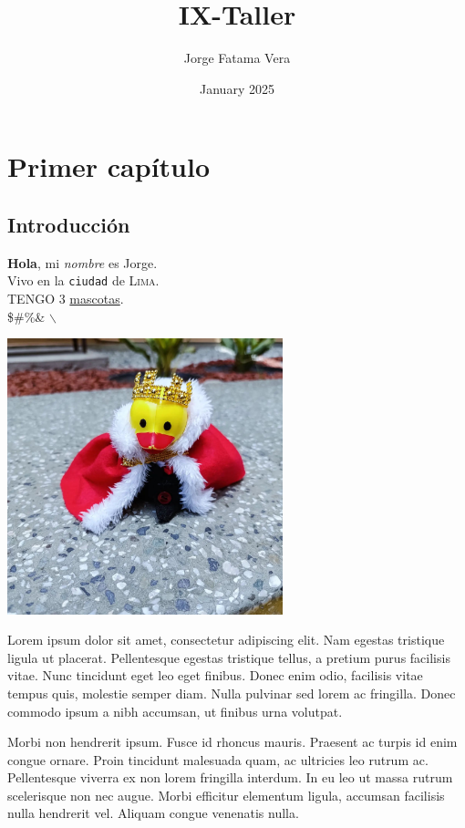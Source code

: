 \documentclass{book}
\title{IX-Taller}
\author{Jorge Fatama Vera}
\date{January 2025}
\begin{document}
\maketitle

\chapter{Primer capítulo}
\section{Introducción}

\textbf{Hola}, mi \textit{nombre} es Jorge.\\[0.3cm]
Vivo en la \texttt{ciudad} de \textsc{Lima}.\\[0.3cm]
\MakeUppercase{Tengo} 3 \underline{mascotas}.\\[0.3cm]
\$\#\%\& $\backslash$

\begin{center} %
    \includegraphics[width=0.6\textwidth]{jpato_rey.jpeg}
\end{center}

Lorem ipsum dolor sit amet, consectetur adipiscing elit. Nam egestas tristique ligula ut placerat. Pellentesque egestas tristique tellus, a pretium purus facilisis vitae. Nunc tincidunt eget leo eget finibus. Donec enim odio, facilisis vitae tempus quis, molestie semper diam. Nulla pulvinar sed lorem ac fringilla. Donec commodo ipsum a nibh accumsan, ut finibus urna volutpat.

\begin{center}
Morbi non hendrerit ipsum. Fusce id rhoncus mauris. Praesent ac turpis id enim congue ornare. Proin tincidunt malesuada quam, ac ultricies leo rutrum ac. Pellentesque viverra ex non lorem fringilla interdum. In eu leo ut massa rutrum scelerisque non nec augue. Morbi efficitur elementum ligula, accumsan facilisis nulla hendrerit vel. Aliquam congue venenatis nulla.
\end{center}
\end{document}

